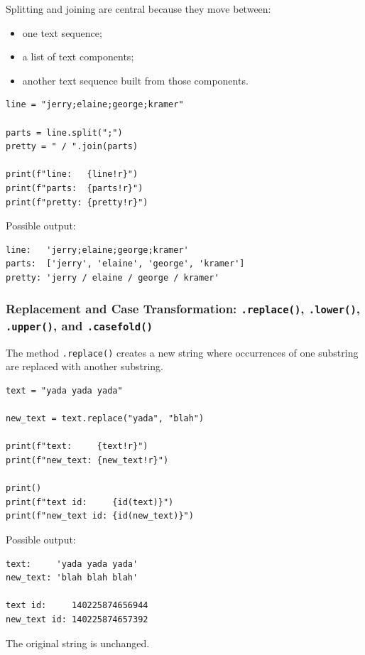 Splitting and joining are central because they move between:

\begin{itemize}
    \item one text sequence;
    \item a list of text components;
    \item another text sequence built from those components.
\end{itemize}

\begin{verbatim}
line = "jerry;elaine;george;kramer"

parts = line.split(";")
pretty = " / ".join(parts)

print(f"line:   {line!r}")
print(f"parts:  {parts!r}")
print(f"pretty: {pretty!r}")
\end{verbatim}

Possible output:

\begin{verbatim}
line:   'jerry;elaine;george;kramer'
parts:  ['jerry', 'elaine', 'george', 'kramer']
pretty: 'jerry / elaine / george / kramer'
\end{verbatim}

\subsubsection{Replacement and Case Transformation: \texttt{.replace()}, \texttt{.lower()}, \texttt{.upper()}, and \texttt{.casefold()}}

The method \texttt{.replace()} creates a new string where occurrences of one substring are replaced with another substring.

\begin{verbatim}
text = "yada yada yada"

new_text = text.replace("yada", "blah")

print(f"text:     {text!r}")
print(f"new_text: {new_text!r}")

print()
print(f"text id:     {id(text)}")
print(f"new_text id: {id(new_text)}")
\end{verbatim}

Possible output:

\begin{verbatim}
text:     'yada yada yada'
new_text: 'blah blah blah'

text id:     140225874656944
new_text id: 140225874657392
\end{verbatim}

The original string is unchanged.

